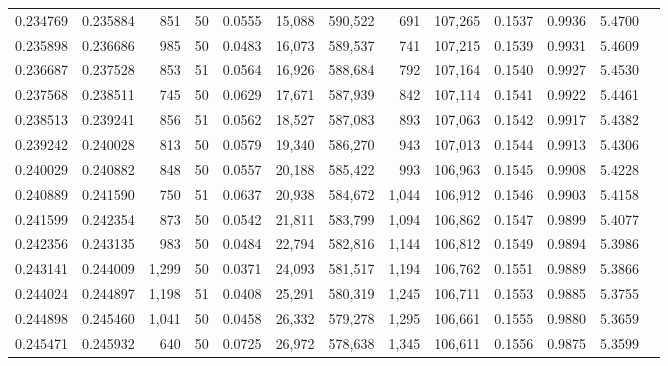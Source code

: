 \begin{tabular}{rrrrrrrrrrrrr}
0.234769 & 0.235884 &   851 &  50 &                                     0.0555 &  15,088 & 590,522 &     691 & 107,265 & 0.1537 & 0.9936 & 5.4700 \\
0.235898 & 0.236686 &   985 &  50 &                                     0.0483 &  16,073 & 589,537 &     741 & 107,215 & 0.1539 & 0.9931 & 5.4609 \\
0.236687 & 0.237528 &   853 &  51 &                                     0.0564 &  16,926 & 588,684 &     792 & 107,164 & 0.1540 & 0.9927 & 5.4530 \\
0.237568 & 0.238511 &   745 &  50 &                                     0.0629 &  17,671 & 587,939 &     842 & 107,114 & 0.1541 & 0.9922 & 5.4461 \\
0.238513 & 0.239241 &   856 &  51 &                                     0.0562 &  18,527 & 587,083 &     893 & 107,063 & 0.1542 & 0.9917 & 5.4382 \\
0.239242 & 0.240028 &   813 &  50 &                                     0.0579 &  19,340 & 586,270 &     943 & 107,013 & 0.1544 & 0.9913 & 5.4306 \\
0.240029 & 0.240882 &   848 &  50 &                                     0.0557 &  20,188 & 585,422 &     993 & 106,963 & 0.1545 & 0.9908 & 5.4228 \\
0.240889 & 0.241590 &   750 &  51 &                                     0.0637 &  20,938 & 584,672 &   1,044 & 106,912 & 0.1546 & 0.9903 & 5.4158 \\
0.241599 & 0.242354 &   873 &  50 &                                     0.0542 &  21,811 & 583,799 &   1,094 & 106,862 & 0.1547 & 0.9899 & 5.4077 \\
0.242356 & 0.243135 &   983 &  50 &                                     0.0484 &  22,794 & 582,816 &   1,144 & 106,812 & 0.1549 & 0.9894 & 5.3986 \\
0.243141 & 0.244009 & 1,299 &  50 &                                     0.0371 &  24,093 & 581,517 &   1,194 & 106,762 & 0.1551 & 0.9889 & 5.3866 \\
0.244024 & 0.244897 & 1,198 &  51 &                                     0.0408 &  25,291 & 580,319 &   1,245 & 106,711 & 0.1553 & 0.9885 & 5.3755 \\
0.244898 & 0.245460 & 1,041 &  50 &                                     0.0458 &  26,332 & 579,278 &   1,295 & 106,661 & 0.1555 & 0.9880 & 5.3659 \\
0.245471 & 0.245932 &   640 &  50 &                                     0.0725 &  26,972 & 578,638 &   1,345 & 106,611 & 0.1556 & 0.9875 & 5.3599 \\

\end{tabular}

